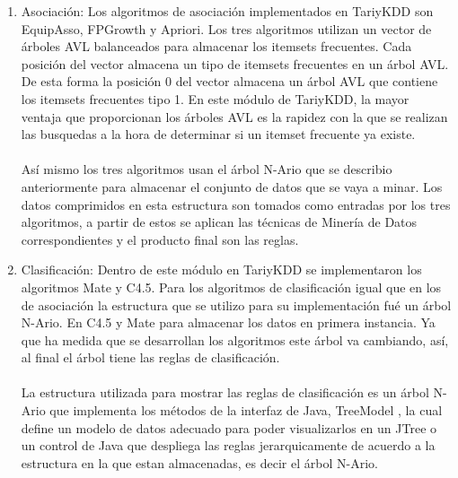 \begin{enumerate}
\item Asociaci\'on: Los algoritmos de asociaci\'on implementados en TariyKDD son EquipAsso, FPGrowth y Apriori.
Los tres algoritmos utilizan un vector de \'arboles AVL balanceados para almacenar los itemsets frecuentes. Cada
posici\'on del vector almacena un tipo de itemsets frecuentes en un \'arbol AVL. De esta forma la posici\'on 0 del
vector almacena un \'arbol AVL que contiene los itemsets frecuentes tipo 1. En este m\'odulo de TariyKDD, la mayor
ventaja que proporcionan los \'arboles AVL es la rapidez con la que se realizan las busquedas a la hora de 
determinar si un itemset frecuente ya existe.\\
\\
As\'i mismo los tres algoritmos usan el \'arbol N-Ario que se describio anteriormente para almacenar el conjunto
de datos que se vaya a minar. Los datos comprimidos en esta estructura son tomados como entradas por los tres
algoritmos, a partir de estos se aplican las t\'ecnicas de Miner\'ia de Datos correspondientes y el producto final
son las reglas.

\item Clasificaci\'on: Dentro de este m\'odulo en TariyKDD se implementaron los algoritmos Mate y C4.5. Para los
algoritmos de clasificaci\'on igual que en los de asociaci\'on la estructura que se utilizo para su 
implementaci\'on fu\'e un \'arbol N-Ario. En C4.5 y Mate para almacenar los datos en primera instancia. Ya que ha
medida que se desarrollan los algoritmos este \'arbol va cambiando, as\'i, al final el \'arbol tiene las reglas
de clasificaci\'on.\\
\\
La estructura utilizada para mostrar las reglas de clasificaci\'on es un \'arbol N-Ario que implementa los
m\'etodos de la interfaz de Java, TreeModel , la cual define un modelo de datos adecuado para poder visualizarlos
en un JTree o un control de Java que despliega las reglas jerarquicamente de acuerdo a la estructura en la que
estan almacenadas, es decir el \'arbol N-Ario.
\end{enumerate}

